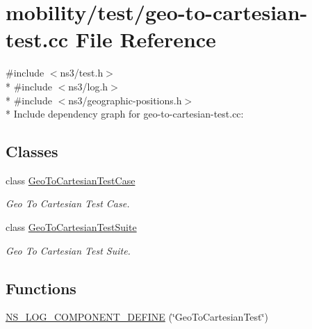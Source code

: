 \hypertarget{geo-to-cartesian-test_8cc}{}\section{mobility/test/geo-\/to-\/cartesian-\/test.cc File Reference}
\label{geo-to-cartesian-test_8cc}
{\ttfamily \#include $<$ns3/test.\+h$>$}\\*
{\ttfamily \#include $<$ns3/log.\+h$>$}\\*
{\ttfamily \#include $<$ns3/geographic-\/positions.\+h$>$}\\*
Include dependency graph for geo-\/to-\/cartesian-\/test.cc\+:
\subsection*{Classes}
\begin{DoxyCompactItemize}
\item 
class \hyperlink{classGeoToCartesianTestCase}{Geo\+To\+Cartesian\+Test\+Case}
\begin{DoxyCompactList}\small\item\em Geo To Cartesian Test Case. \end{DoxyCompactList}\item 
class \hyperlink{classGeoToCartesianTestSuite}{Geo\+To\+Cartesian\+Test\+Suite}
\begin{DoxyCompactList}\small\item\em Geo To Cartesian Test Suite. \end{DoxyCompactList}\end{DoxyCompactItemize}
\subsection*{Functions}
\begin{DoxyCompactItemize}
\item 
\hyperlink{geo-to-cartesian-test_8cc_a86eeff7446bdd5a305bde7dbc3f362d9}{N\+S\+\_\+\+L\+O\+G\+\_\+\+C\+O\+M\+P\+O\+N\+E\+N\+T\+\_\+\+D\+E\+F\+I\+NE} (\char`\"{}Geo\+To\+Cartesian\+Test\char`\"{})
\end{DoxyCompactItemize}
